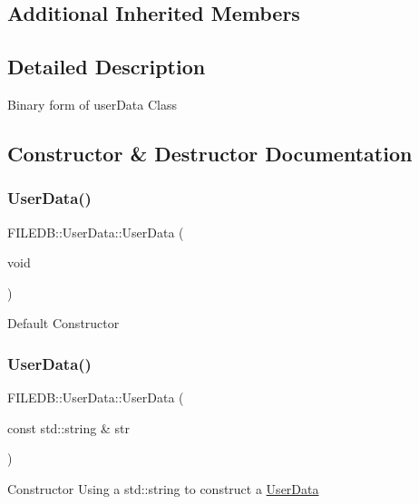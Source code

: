 \subsection*{Additional Inherited Members}


\subsection{Detailed Description}
Binary form of user\+Data Class 

\subsection{Constructor \& Destructor Documentation}
\mbox{\label{classFILEDB_1_1UserData_ab92cdcf29a782d8d731752d12f849919}} 
\subsubsection{\texorpdfstring{UserData()}{UserData()}\hspace{0.1cm}{\footnotesize\ttfamily [1/10]}}
{\footnotesize\ttfamily F\+I\+L\+E\+D\+B\+::\+User\+Data\+::\+User\+Data (\begin{DoxyParamCaption}\item[{void}]{ }\end{DoxyParamCaption})}

Default Constructor \mbox{\label{classFILEDB_1_1UserData_a47d70a4d9bce994d9ec79e30642120f0}} 
\subsubsection{\texorpdfstring{UserData()}{UserData()}\hspace{0.1cm}{\footnotesize\ttfamily [2/10]}}
{\footnotesize\ttfamily F\+I\+L\+E\+D\+B\+::\+User\+Data\+::\+User\+Data (\begin{DoxyParamCaption}\item[{const std\+::string \&}]{str }\end{DoxyParamCaption})}

Constructor Using a std\+::string to construct a \mbox{\hyperlink{classFILEDB_1_1UserData}{User\+Data}} \mbox{\label{classFILEDB_1_1UserData_ad0aaf29e2f7dcd413f9dca937422aeec}} 
